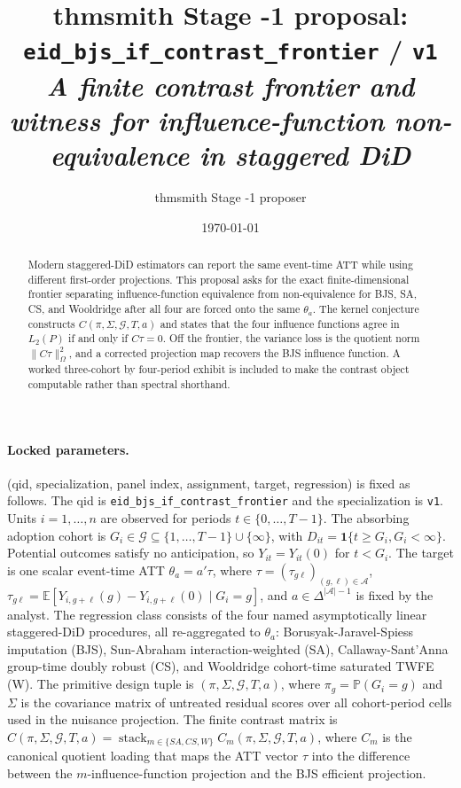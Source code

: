 \documentclass[11pt]{article}
\title{thmsmith Stage -1 proposal: \texttt{eid\_bjs\_if\_contrast\_frontier} / \texttt{v1}%
  \\ \large\textit{A finite contrast frontier and witness for influence-function non-equivalence in staggered DiD}}
\author{thmsmith Stage -1 proposer}
\date{\today}
\newcommand{\E}{\mathbb{E}}
\renewcommand{\Pr}{\mathbb{P}}
\newcommand{\one}{\mathbf{1}}
\theoremstyle{definition}
\theoremstyle{plain}
\theoremstyle{remark}
\begin{document}
\maketitle


\paragraph{Locked parameters.}
(qid, specialization, panel index, assignment, target, regression) is fixed as follows. The qid is \texttt{eid\_bjs\_if\_contrast\_frontier} and the specialization is \texttt{v1}. Units \(i=1,\ldots,n\) are observed for periods \(t\in\{0,\ldots,T-1\}\). The absorbing adoption cohort is \(G_i\in\mathcal G\subseteq\{1,\ldots,T-1\}\cup\{\infty\}\), with \(D_{it}=\one\{t\ge G_i, G_i<\infty\}\). Potential outcomes satisfy no anticipation, so \(Y_{it}=Y_{it}(0)\) for \(t<G_i\). The target is one scalar event-time ATT \(\theta_a=a'\tau\), where \(\tau=(\tau_{g\ell})_{(g,\ell)\in\mathcal A}\), \(\tau_{g\ell}=\E[Y_{i,g+\ell}(g)-Y_{i,g+\ell}(0)\mid G_i=g]\), and \(a\in\Delta^{|\mathcal A|-1}\) is fixed by the analyst. The regression class consists of the four named asymptotically linear staggered-DiD procedures, all re-aggregated to \(\theta_a\): Borusyak-Jaravel-Spiess imputation (BJS), Sun-Abraham interaction-weighted (SA), Callaway-Sant'Anna group-time doubly robust (CS), and Wooldridge cohort-time saturated TWFE (W). The primitive design tuple is \((\pi,\Sigma,\mathcal G,T,a)\), where \(\pi_g=\Pr(G_i=g)\) and \(\Sigma\) is the covariance matrix of untreated residual scores over all cohort-period cells used in the nuisance projection. The finite contrast matrix is \(C(\pi,\Sigma,\mathcal G,T,a)=\operatorname{stack}_{m\in\{SA,CS,W\}} C_m(\pi,\Sigma,\mathcal G,T,a)\), where \(C_m\) is the canonical quotient loading that maps the ATT vector \(\tau\) into the difference between the \(m\)-influence-function projection and the BJS efficient projection.

\begin{abstract}
Modern staggered-DiD estimators can report the same event-time ATT while using different first-order projections. This proposal asks for the exact finite-dimensional frontier separating influence-function equivalence from non-equivalence for BJS, SA, CS, and Wooldridge after all four are forced onto the same \(\theta_a\). The kernel conjecture constructs \(C(\pi,\Sigma,\mathcal G,T,a)\) and states that the four influence functions agree in \(L_2(P)\) if and only if \(C\tau=0\). Off the frontier, the variance loss is the quotient norm \(\|C\tau\|^2_{\Omega}\), and a corrected projection map recovers the BJS influence function. A worked three-cohort by four-period exhibit is included to make the contrast object computable rather than spectral shorthand.
\end{abstract}
\end{document}
